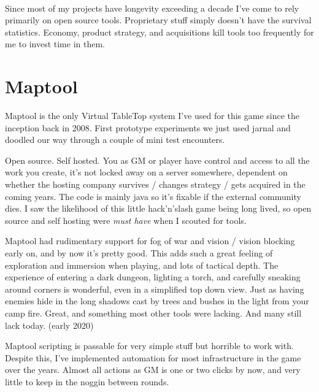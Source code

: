 \

Since most of my projects have longevity exceeding a decade I've come to rely primarily on open source tools. Proprietary stuff simply doesn't have the survival statistics. Economy, product strategy, and acquisitions kill tools too frequently for me to invest time in them.








\section*{Maptool}
Maptool is the only Virtual TableTop system I've used for this game since the inception back in 2008. First prototype experiments we just used jarnal and doodled our way through a couple of mini test encounters.

Open source. Self hosted. You as GM or player have control and access to all the work you create, it's not locked away on a server somewhere, dependent on whether the hosting company survives / changes strategy / gets acquired in the coming years. The code is mainly java so it's fixable if the external community dies. I saw the likelihood of this little hack'n'slash game being long lived, so open source and self hosting were \textit{must have} when I scouted for tools.

Maptool had rudimentary support for fog of war and vision / vision blocking early on, and by now it's pretty good. This adds such a great feeling of exploration and immersion when playing, and lots of tactical depth. The experience of entering a dark dungeon, lighting a torch, and carefully sneaking around corners is wonderful, even in a simplified top down view. Just as having enemies hide in the long shadows cast by trees and bushes in the light from your camp fire. Great, and something most other tools were lacking. And many still lack today. \vvsmall(early 2020)\normalsize

Maptool scripting is passable for very simple stuff but horrible to work with. Despite this, I've implemented automation for most infrastructure in the game over the years. Almost all actions as GM is one or two clicks by now, and very little to keep in the noggin between rounds.

